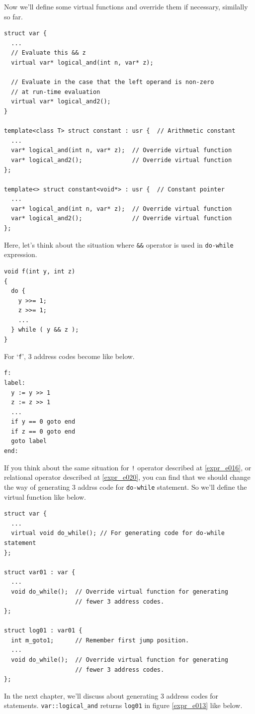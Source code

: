 Now we'll define some virtual functions and override them if 
necessary, similally so far.
\begin{verbatim}
struct var {
  ...
  // Evaluate this && z
  virtual var* logical_and(int n, var* z);

  // Evaluate in the case that the left operand is non-zero
  // at run-time evaluation
  virtual var* logical_and2();
}

template<class T> struct constant : usr {  // Arithmetic constant
  ...
  var* logical_and(int n, var* z);  // Override virtual function
  var* logical_and2();              // Override virtual function
};

template<> struct constant<void*> : usr {  // Constant pointer
  ...
  var* logical_and(int n, var* z);  // Override virtual function
  var* logical_and2();              // Override virtual function
};
\end{verbatim}
Here, let's think about the situation where {\tt{\&\&}} operator
is used in {\tt{do-while}} expression.
\begin{verbatim}
void f(int y, int z)
{
  do {
    y >>= 1;
    z >>= 1;
    ...
  } while ( y && z );
}
\end{verbatim}
For `{\tt{f}}', 3 address codes become like below.
\begin{verbatim}
f:
label:
  y := y >> 1
  z := z >> 1
  ...
  if y == 0 goto end
  if z == 0 goto end
  goto label
end:
\end{verbatim}
If you think about the same situation for {\tt{!}} operator 
described at \ref{expr_e016}, or relational operator
described at \ref{expr_e020}, you can find that
we should change the way of generating 3 addrss code
for {\tt{do-while}} statement. So we'll define the virtual
function like below.
\begin{verbatim}
struct var {
  ...
  virtual void do_while(); // For generating code for do-while statement
};

struct var01 : var {
  ...
  void do_while();  // Override virtual function for generating
                    // fewer 3 address codes.
};

struct log01 : var01 {
  int m_goto1;      // Remember first jump position.
  ...
  void do_while();  // Override virtual function for generating
                    // fewer 3 address codes.
};
\end{verbatim}
In the next chapter, we'll discuss about generating 3 address codes
for statements. {\tt{var::logical\_and}} returns {\tt{log01}} in
figure \ref{expr_e013} like below.
